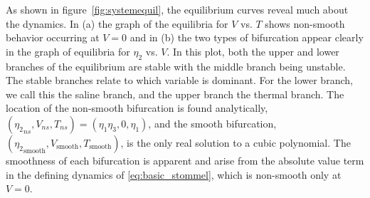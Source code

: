 As shown in figure~\ref{fig:systemequil}, the equilibrium curves reveal much about the dynamics. In (a) the graph of the equilibria for $V$ vs. $T$ shows non-smooth behavior occurring at $V=0$ and in (b) the two types of bifurcation appear clearly in the graph of equilibria for $\eta_2$ vs. $V$. In this plot, both the upper and lower branches of the equilibrium are stable with the middle branch being unstable. The stable branches relate to which variable is dominant. For the lower branch, we call this the saline branch, and the upper branch the thermal branch. The location of the non-smooth bifurcation is found analytically, $({\eta_2}_{ns},V_{ns},T_{ns})=(\eta_1\eta_3,0,\eta_1)$, and the smooth bifurcation, $({\eta_2}_{\text{smooth}},V_{\text{smooth}},T_{\text{smooth}})$, is the only real solution to a cubic polynomial. The smoothness of each bifurcation is apparent and arise from the absolute value term in the defining dynamics of \eqref{eq:basic_stommel}, which is non-smooth only at $V=0$.

